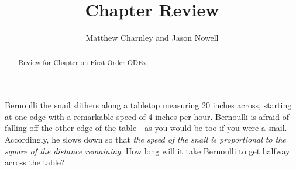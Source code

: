\documentclass{ximera}
\title{Chapter Review}
\author{Matthew Charnley and Jason Nowell}
\begin{document}
\begin{abstract}
    Review for Chapter on First Order ODEs.
\end{abstract}
\maketitle

\begin{exercise}
    Bernoulli the snail slithers along a tabletop measuring 20 inches across, starting at one edge with a remarkable speed of 4 inches per hour. Bernoulli is afraid of falling off the other edge of the table---as you would be too if you were a snail. Accordingly, he slows down so that {\it the speed of the snail is proportional to the square of the distance remaining}. How long will it take Bernoulli to get halfway across the table? %
\end{exercise}
\end{document}
